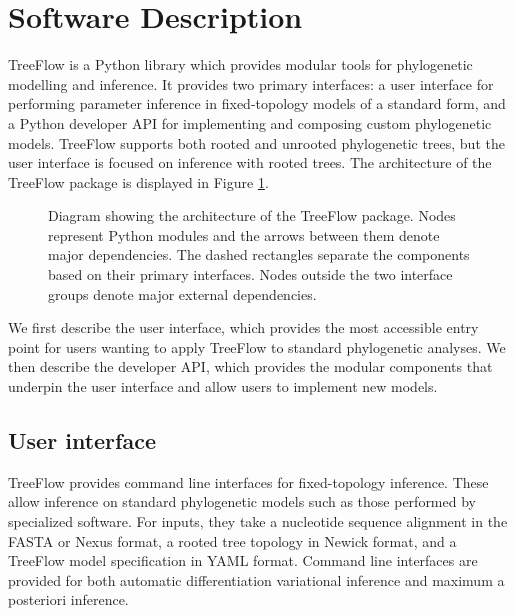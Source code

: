 \documentclass[oupdraft]{sysbio_sse}
\begin{document}
\section{Software Description}

TreeFlow is a Python library which provides modular tools for phylogenetic modelling and inference. It provides two primary interfaces: a user interface for performing parameter inference in fixed-topology models of a standard form, and a Python developer API for implementing and composing custom phylogenetic models. TreeFlow supports both rooted and unrooted phylogenetic trees, but the user interface is focused on inference with rooted trees. The architecture of the TreeFlow package is displayed in Figure \ref{fig:architecture}.

\newlength{\originalbaselineskip}
\setlength{\originalbaselineskip}{\baselineskip}

\begin{figure}
    \centering
    
    \caption{Diagram showing the architecture of the TreeFlow package. Nodes represent Python modules and the arrows between them denote major dependencies. The dashed rectangles separate the components based on their primary interfaces. Nodes outside the two interface groups denote major external dependencies.}
    \label{fig:architecture}
\end{figure}

\setlength{\baselineskip}{\originalbaselineskip}

We first describe the user interface, which provides the most accessible entry point for users wanting to apply TreeFlow to standard phylogenetic analyses. We then describe the developer API, which provides the modular components that underpin the user interface and allow users to implement new models.

\subsection{User interface}

TreeFlow provides command line interfaces for fixed-topology inference. These allow inference on standard phylogenetic models such as those performed by specialized software. For inputs, they take a nucleotide sequence alignment in the FASTA or Nexus format, a rooted tree topology in Newick format, and a TreeFlow model specification in YAML format. Command line interfaces are provided for both automatic differentiation variational inference and maximum a posteriori inference.
\end{document}
